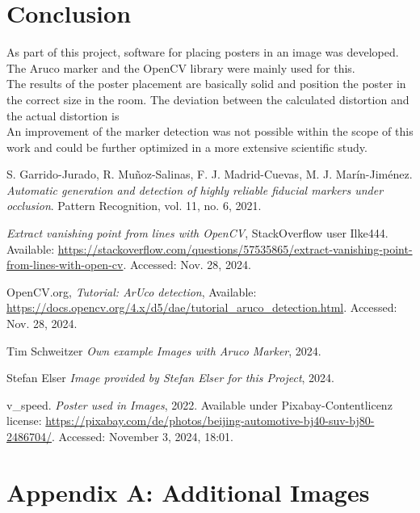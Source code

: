 \documentclass[a4paper,twocolumn]{article}
\begin{document}
\section{Conclusion}
As part of this project, software for placing posters in an image was developed. The Aruco marker and the OpenCV library were mainly used for this.
\\
The results of the poster placement are basically solid and position the poster in the correct size in the room. The deviation between the calculated distortion and the actual distortion is
\\
An improvement of the marker detection was not possible within the scope of this work and could be further optimized in a more extensive scientific study.

\begin{thebibliography}{9}

    S. Garrido-Jurado, R. Muñoz-Salinas, F. J. Madrid-Cuevas, M. J. Marín-Jiménez. 
    \textit{Automatic generation and detection of highly reliable fiducial markers under occlusion}. 
    Pattern Recognition, vol. 11, no. 6, 2021.
    
    \textit{Extract vanishing point from lines with OpenCV}, 
    StackOverflow user Ilke444. Available: \url{https://stackoverflow.com/questions/57535865/extract-vanishing-point-from-lines-with-open-cv}. 
    Accessed: Nov. 28, 2024.

    OpenCV.org, 
    \textit{Tutorial: ArUco detection}, 
    Available: \url{https://docs.opencv.org/4.x/d5/dae/tutorial_aruco_detection.html}. 
    Accessed: Nov. 28, 2024.

    Tim Schweitzer \textit{Own example Images with Aruco Marker}, 2024.

    Stefan Elser \textit{Image provided by Stefan Elser for this Project}, 2024.

    v\_speed. \textit{Poster used in Images}, 2022. Available under Pixabay-Contentlicenz license: \url{https://pixabay.com/de/photos/beijing-automotive-bj40-suv-bj80-2486704/}. Accessed: November 3, 2024, 18:01.

\end{thebibliography}

\appendix
\section*{Appendix A: Additional Images}
\end{document}
